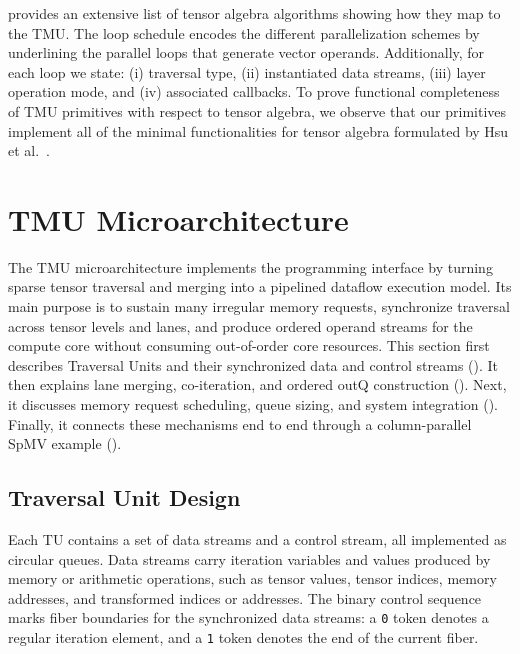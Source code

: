  provides an extensive list of tensor algebra algorithms showing how they map to the TMU. The loop schedule encodes the different parallelization schemes by underlining the parallel loops that generate vector operands. Additionally, for each loop we state: (i) traversal type, (ii) instantiated data streams, (iii) layer operation mode, and (iv) associated callbacks.
To prove functional completeness of TMU primitives with respect to tensor algebra, we observe that our primitives implement all of the minimal functionalities for tensor algebra formulated by Hsu et al.~\cite{hsu2023asplos}.

\section{TMU Microarchitecture} \label{sec:tmu-microarchitecture} %

The TMU microarchitecture implements the programming interface by turning sparse tensor traversal and merging into a pipelined dataflow execution model.
Its main purpose is to sustain many irregular memory requests, synchronize traversal across tensor levels and lanes, and produce ordered operand streams for the compute core without consuming out-of-order core resources.
This section first describes Traversal Units and their synchronized data and control streams ().
It then explains lane merging, co-iteration, and ordered outQ construction ().
Next, it discusses memory request scheduling, queue sizing, and system integration ().
Finally, it connects these mechanisms end to end through a column-parallel SpMV example ().

\subsection{Traversal Unit Design} \label{sec:tmu-traversal-unit-design} %

Each TU contains a set of data streams and a control stream, all implemented as circular queues.
Data streams carry iteration variables and values produced by memory or arithmetic operations, such as tensor values, tensor indices, memory addresses, and transformed indices or addresses.
The binary control sequence marks fiber boundaries for the synchronized data streams: a \texttt{0} token denotes a regular iteration element, and a \texttt{1} token denotes the end of the current fiber.

